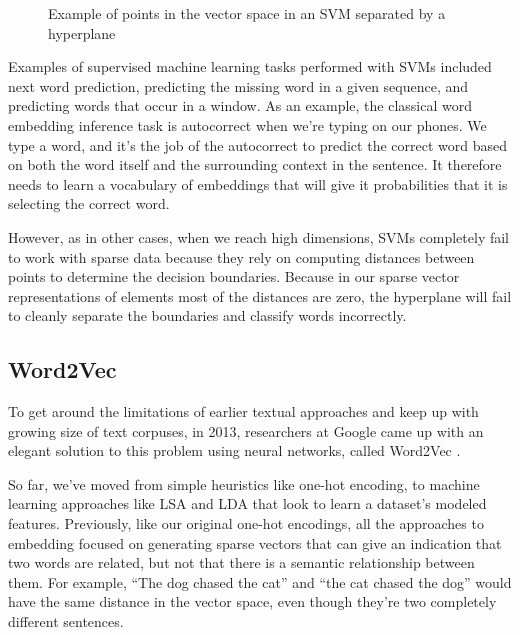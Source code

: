 \documentclass[11pt, table]{diazessay} %
\begin{document}
\begin{sloppypar}
\begin{figure}[H]
\caption{Example of points in the vector space in an SVM separated by a hyperplane}
\end{figure}


Examples of supervised machine learning tasks performed with SVMs included next word prediction, predicting the missing word in a given sequence, and predicting words that occur in a window. As an example, the classical word embedding inference task is autocorrect when we're typing on our phones. We type a word, and it's the job of the autocorrect to predict the correct word based on both the word itself and the surrounding context in the sentence. It therefore needs to learn a vocabulary of embeddings that will give it probabilities that it is selecting the correct word.

However, as in other cases, when we reach high dimensions, SVMs completely fail to work with sparse data because they rely on computing distances between points to determine the decision boundaries. Because in our sparse vector representations of elements most of the distances are zero, the hyperplane will fail to cleanly separate the boundaries and classify words incorrectly.

\subsection{Word2Vec}

To get around the limitations of earlier textual approaches and keep up with growing size of text corpuses, in 2013, researchers at Google came up with an elegant solution to this problem using neural networks, called Word2Vec \citep{mikolov2013efficient}.  

So far, we've moved from simple heuristics like one-hot encoding, to machine learning approaches like LSA and LDA that look to learn a dataset's modeled features.  Previously, like our original one-hot encodings, all the approaches to embedding focused on generating sparse vectors that can give an indication that two words are related, but not that there is a semantic relationship between them. For example, “The dog chased the cat” and “the cat chased the dog” would have the same distance in the vector space, even though they’re two completely different sentences.


\end{sloppypar}
\end{document}
